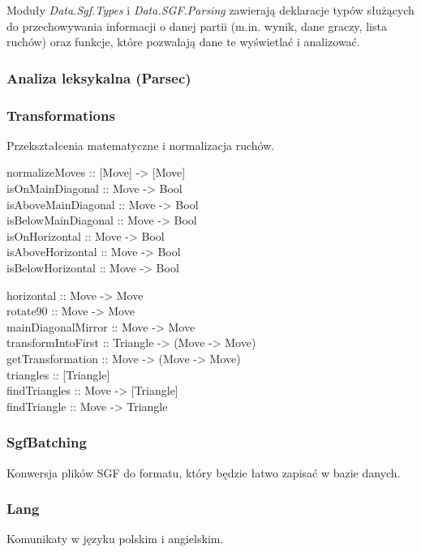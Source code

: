 \documentclass[10pt,leqno]{article}
\begin{document}
Moduły \emph{Data.Sgf.Types} i \emph{Data.SGF.Parsing} zawierają deklaracje typów służących do 
przechowywania informacji o danej partii (m.in. wynik, dane graczy, lista ruchów) oraz funkcje, które
pozwalają dane te wyświetlać i analizować. 

\subsubsection{Analiza leksykalna (Parsec)}

\subsubsection{Transformations}
Przekształcenia matematyczne i normalizacja ruchów.

\begin{framed}
\noindent normalizeMoves :: [Move] -> [Move] \\

\noindent isOnMainDiagonal :: Move -> Bool  \\
isAboveMainDiagonal :: Move -> Bool \\
isBelowMainDiagonal :: Move -> Bool \\
isOnHorizontal :: Move -> Bool \\
isAboveHorizontal :: Move -> Bool \\
isBelowHorizontal :: Move -> Bool

\noindent horizontal :: Move -> Move \\
rotate90 :: Move -> Move \\
mainDiagonalMirror :: Move -> Move \\

\noindent transformIntoFirst :: Triangle -> (Move -> Move) \\
getTransformation :: Move -> (Move -> Move) \\

\noindent triangles :: [Triangle] \\
findTriangles :: Move -> [Triangle] \\
findTriangle :: Move -> Triangle
\end{framed}

\subsubsection{SgfBatching}
Konwersja plików SGF do formatu, który będzie łatwo zapisać w bazie danych.

\subsubsection{Lang}
Komunikaty w języku polskim i angielskim.
\end{document}
